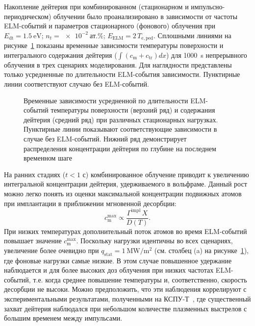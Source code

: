 Накопление дейтерия при комбинированном (стационарном и импульсно-периодическом) облучении было проанализировано в зависимости от частоты ELM-событий и параметров стационарного (фонового) облучения при $E_{\mathrm{dt}}=\SI{1.5}{\electronvolt}$; $n_{t}=\SI{e-2}{\text{ат.}\percent}$; $E_{\mathrm{ELM}}=2\, T_{\mathrm{e,ped}}$. Сплошными линиями на рисунке~\cref{fig:ch3/ELMs_frequency} показаны временные зависимости температуры поверхности и интегрального содержания дейтерия ($\int \left(c_{\mathrm{m}}+c_{\mathrm{tr}}\right)dx$) для \SI{1000}{\second} непрерывного облучения в трех сценариях моделирования. Для наглядности представлены только усредненные по длительности ELM-события зависимости. Пунктирные линии соответствуют случаю без ELM-событий.
\begin{figure}[ht]
	\caption{Временные зависимости усредненной по длительности ELM-событий температуры поверхности (верхний ряд) и содержания дейтерия (средний ряд) при различных стационарных нагрузках. Пунктирные линии показывают соответствующие зависимости в случае без ELM-событий. Нижний ряд демонстрирует распределения концентрации дейтерия по глубине на последнем временном шаге}\label{fig:ch3/ELMs_frequency}
\end{figure}
На ранних стадиях ($t<1$ с) комбинированное облучение приводит к увеличению интегральной концентрации дейтерия, удерживаемого в вольфраме. Данный рост можно легко понять из оценки максимальной концентрации подвижных атомов при имплантации в приближении мгновенной десорбции:
\begin{equation}
	\label{eq:ch3/max_c}
	c_{\mathrm{m}}^{\max}\propto \frac{\Gamma^{\mathrm{impl}} \, X}{D(T)}.
\end{equation}
При низких температурах дополнительный поток атомов во время ELM-событий повышает значение $c_{\mathrm{m}}^{\max}$. Поскольку нагрузки идентичны во всех сценариях, увеличение более очевидно при $q_{\mathrm{stat}}=\SI{1}{\mega\watt\per\meter\squared}$ (см. столбец (a) на рисунке~\cref{fig:ch3/ELMs_frequency}), где фоновые нагрузки самые низкие. В этом случае повышенное удержание наблюдается и для более высоких доз облучения при низких частотах ELM-событий, т.е. когда среднее повышение температуры и, соответственно, скорость десорбции не высоки. Можно предположить, что эти наблюдения коррелируют с экспериментальными результатами, полученными на КСПУ-Т~\cite{Ogorodnikova,Poskakalov2020}, где существенный захват дейтерия наблюдался при небольшом количестве плазменных выстрелов с большим временем между импульсами.

